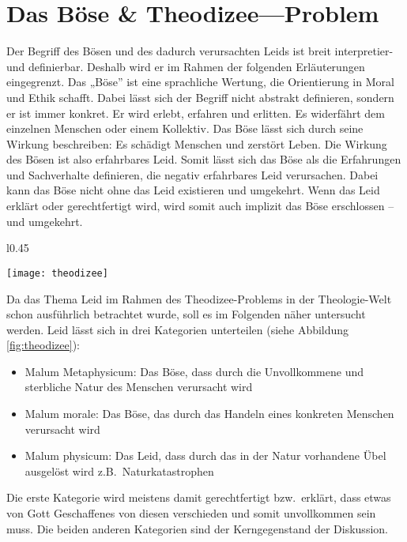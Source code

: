 \chapter{Das Böse \& Theodizee---Problem}\label{Theodizee}
Der Begriff des \glqq Bösen\grqq{} und des dadurch verursachten Leids ist breit interpretier- und definierbar. Deshalb wird er im Rahmen der folgenden Erläuterungen eingegrenzt. Das „Böse” ist eine sprachliche Wertung, die Orientierung in Moral und Ethik schafft. Dabei lässt sich der Begriff nicht abstrakt definieren, sondern er ist immer konkret. Er wird erlebt, erfahren und erlitten. Es widerfährt dem einzelnen Menschen oder einem Kollektiv. Das Böse lässt sich durch seine Wirkung beschreiben: Es schädigt Menschen und zerstört Leben. Die Wirkung des Bösen ist also erfahrbares Leid. Somit lässt sich das Böse als die Erfahrungen und Sachverhalte definieren, die negativ erfahrbares Leid verursachen. Dabei kann das Böse nicht ohne das Leid existieren und umgekehrt. Wenn das Leid erklärt oder gerechtfertigt wird, wird somit auch implizit das Böse erschlossen – und umgekehrt.\\

\begin{wrapfigure}[20]{l}{0.45\linewidth}
    \begin{center}
        \texttt{[image: theodizee]}
        \caption{Die 3 Übel}\label{fig:theodizee}
    \end{center}
\end{wrapfigure}

Da das Thema Leid im Rahmen des Theodizee-Problems in der Theologie-Welt schon ausführlich betrachtet wurde, soll es im Folgenden näher untersucht werden. Leid lässt sich in drei Kategorien unterteilen (siehe Abbildung \ref{fig:theodizee}):
\begin{itemize}
    \item Malum Metaphysicum: Das Böse, dass durch die Unvollkommene und sterbliche Natur des Menschen verursacht wird
    \item Malum morale: Das Böse, das durch das Handeln eines konkreten Menschen verursacht wird
    \item Malum physicum: Das Leid, dass durch das in der Natur vorhandene Übel ausgelöst wird z.B.\ Naturkatastrophen
\end{itemize}
Die erste Kategorie wird meistens damit gerechtfertigt bzw.\ erklärt, dass etwas von Gott Geschaffenes von diesen verschieden und somit unvollkommen sein muss. Die beiden anderen Kategorien sind der Kerngegenstand der Diskussion.\\

